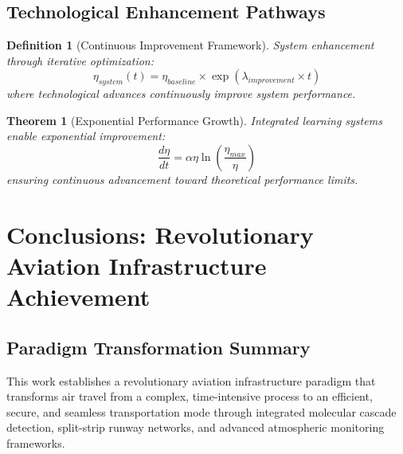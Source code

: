 \documentclass[12pt,a4paper]{article}
\newtheorem{theorem}{Theorem}
\newtheorem{definition}{Definition}
\begin{document}
\subsection{Technological Enhancement Pathways}

\begin{definition}[Continuous Improvement Framework]
System enhancement through iterative optimization:
\begin{equation}
\eta_{system}(t) = \eta_{baseline} \times \exp(\lambda_{improvement} \times t)
\end{equation}
where technological advances continuously improve system performance.
\end{definition}

\begin{theorem}[Exponential Performance Growth]
Integrated learning systems enable exponential improvement:
\begin{equation}
\frac{d\eta}{dt} = \alpha \eta \ln\left(\frac{\eta_{max}}{\eta}\right)
\end{equation}
ensuring continuous advancement toward theoretical performance limits.
\end{theorem}

\section{Conclusions: Revolutionary Aviation Infrastructure Achievement}

\subsection{Paradigm Transformation Summary}

This work establishes a revolutionary aviation infrastructure paradigm that transforms air travel from a complex, time-intensive process to an efficient, secure, and seamless transportation mode through integrated molecular cascade detection, split-strip runway networks, and advanced atmospheric monitoring frameworks.
\end{document}
